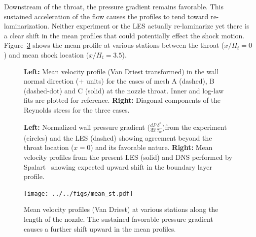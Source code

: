 \documentclass[]{aiaa-tc}%
\begin{document}




Downstream of the throat, the pressure gradient remains favorable.  This sustained acceleration of the flow causes the profiles to tend toward re-laminarization.  Neither experiment or the LES actually re-laminarize yet there is a clear shift in the mean profiles that could potentially effect the shock motion.  Figure~\ref{fig:stations} shows the mean profile at various stations between the throat ($x/H_t=0$) and mean shock location ($x/H_t=3.5$).


\begin{figure}[!ht]
	\caption{ {\bf Left:} Mean velocity profile (Van Driest transformed) in the wall normal direction ($+$ units) for the cases of mesh A (dashed), B (dashed-dot) and C (solid) at the nozzle throat.  Inner and log-law fits are plotted for reference.  {\bf Right:} Diagonal components of the Reynolds stress for the three cases.
	\label{fig:BL_prof}
	}
\end{figure}


\begin{figure}[!ht]
	\caption{ {\bf Left:} Normalized wall pressure gradient ($\frac{dP}{dx} \frac{\delta^*}{\tau_w}$)from the experiment (circles) and the LES (dashed) showing agreement beyond the throat location ($x=0$) and its favorable nature.  {\bf Right:} Mean velocity profiles from the present LES (solid) and DNS performed by Spalart~\cite{Spalart:93} showing expected upward shift in the boundary layer profile.
 	\label{fig:dPdx}
	}
\end{figure}



\begin{figure}[!ht]
	\begin{centering}
	\texttt{[image: ../../figs/mean\_st.pdf]}

	\caption{ Mean velocity profiles (Van Driest) at various stations along the length of the nozzle.  The sustained favorable pressure gradient causes a further shift upward in the mean profiles.
 	\label{fig:stations}
	}
	\end{centering}
\end{figure}
\end{document}
